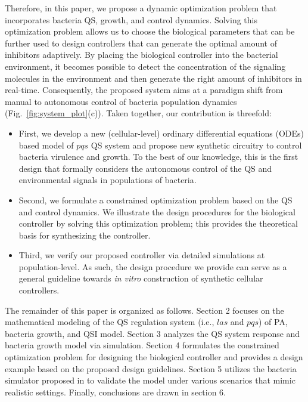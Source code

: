 \documentclass[runningheads]{llncs}
\begin{document}
 Therefore, in this paper, we propose a dynamic optimization problem that incorporates bacteria QS, growth, and control dynamics. Solving this optimization problem allows us to choose the biological parameters that can be further used to design controllers that can generate the optimal amount of inhibitors adaptively.  By placing the biological controller into the bacterial environment, it becomes possible to detect the concentration of the signaling molecules in the environment and then generate the right amount of inhibitors in real-time. Consequently, the proposed system aims at a paradigm shift from manual to autonomous control of bacteria population dynamics (Fig.~\ref{fig:system_plot}(c)). Taken together, our contribution is threefold:
\begin{itemize}
  \item First, we develop a new (cellular-level) ordinary differential equations (ODEs) based model of $pqs$ QS system and propose new synthetic circuitry to control bacteria virulence and growth. To the best of our knowledge, this is the first design that formally considers the autonomous control of the QS and environmental signals in populations of bacteria. 
  \item Second, we formulate a constrained optimization problem based on the QS and control dynamics. We illustrate the design procedures for the biological controller by solving this optimization problem; this provides the theoretical basis for synthesizing the controller.    
  \item Third, we verify our proposed controller via detailed simulations at population-level. As such, the design procedure we provide can serve as a general guideline towards \textit{in vitro} construction of synthetic cellular controllers. 
  \end{itemize}

The remainder of this paper is organized as follows. Section 2 focuses on the mathematical modeling of the QS regulation system (i.e., $las$ and $pqs$) of PA, bacteria growth, and QSI model. Section 3 analyzes the QS system response and bacteria growth model via simulation.  Section 4 formulates the constrained optimization problem for designing the biological controller and provides a design example based on the proposed design guidelines. Section 5 utilizes the bacteria simulator proposed in \cite{Wei2013} to validate the model under various scenarios that mimic realistic settings. Finally, conclusions are drawn in section 6.  
\end{document}
